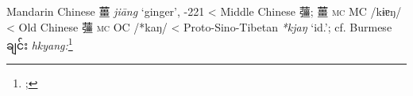 \begin{etymology}\label{ety:jiang}
Mandarin Chinese {薑} \textit{jiāng} `ginger', -221
< Middle Chinese {䕬; 薑} \textsc{mc} MC /kɨɐŋ/
< Old Chinese {䕬} \textsc{mc} OC /*kaŋ/
< Proto-Sino-Tibetan \textit{*kjaŋ} `id.'; cf. Burmese ချင်း \textit{hkyang:}\footnote{; }
\end{etymology}